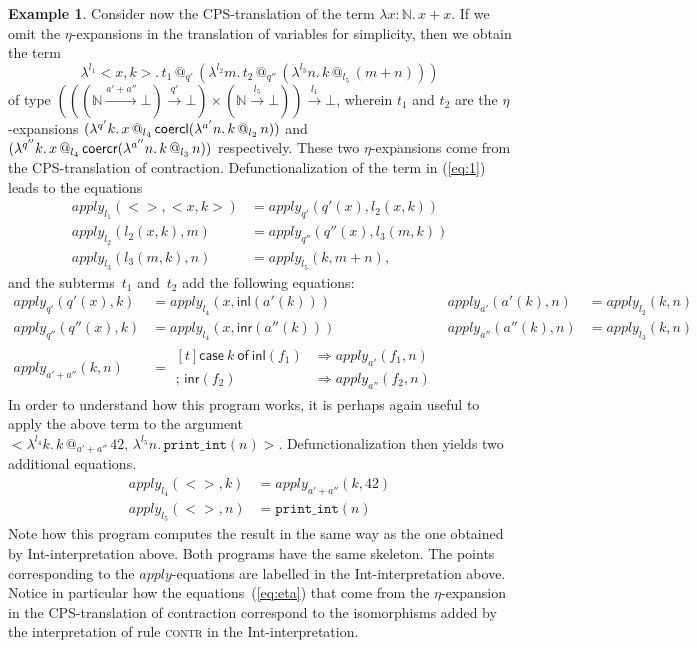 \documentclass{LMCS}
\makeatletter
\theoremstyle{definition}
\newtheorem{example}[thm]{Example}
\theoremstyle{plain}
\newcommand{\kw}[1]{\mathsf{#1}}
\newcommand{\NN}{\mathbb{N}}
\newcommand{\Capply}{\textit{apply}}
\newcommand{\R}[1]{\textsc{#1}}
\newcommand{\xto}{\xrightarrow}
\newcommand{\tlami}[3]{\lambda {#1}{:}{#2}.\, {#3}}
\newcommand{\tappl}[3]{{#1} {\,@_{#2}\,} {#3}}
\newcommand{\tmcase}[5]{\!\begin{aligned}[t]
  \kw{case}\ #1\ \kw{of}\ 
     \kw{inl}(#2) &\Rightarrow #3 \\[-.27em]
    ;\, \kw{inr}(#4) &\Rightarrow #5    
  \end{aligned}
  }
\makeatother
\begin{document}
\begin{example}
Consider now the CPS-translation of the term
$\tlami x \NN {x + x}$.
If we omit the $\eta$-expansions in the translation of 
variables for simplicity, then
we obtain the term
\begin{equation}
  \label{eq:1}
  \lambda^{l_1} <x,k>.\, \tappl {t_1} {q'} {(\lambda^{l_2} m.\, \tappl {t_2} {q''} {(\lambda^{l_3} n.\, \tappl k {l_5} {(m+n)})})}
\end{equation}
of type 
$ (((\NN \xto{a'+a''} \bot) \xto{q'} \bot) 
  \times (\NN \xto{l_5} \bot))
  \xto{l_1} \bot$,
wherein
$t_1$ and $t_2$ are
the $\eta$-expansions
$(\lambda^{q'} k.\, \tappl x {l_4} {\coercl{a'+a''}{\lambda^{a'} n.\, \tappl k {l_2} n)}}$
and
$(\lambda^{q''} k.\, \tappl x {l_4} {\coercr{a'+a''}{\lambda^{a''} n.\, \tappl k {l_3} n)}}$
respectively.
These two $\eta$-expansions come from the CPS-translation of contraction.
Defunctionalization of the term in (\ref{eq:1}) leads to the equations
\begin{align*}
  \Capply_{l_1}(<>, <x,k>) &= \Capply_{q'}(q'(x), {l_2}(x,k))
  \\
  \Capply_{l_2}(l_2(x,k), m) &= \Capply_{q''}(q''(x), l_3(m,k))
  \\
  \Capply_{l_3}(l_3(m,k),n) &= \Capply_{l_5}(k, m+n),
\end{align*}
and the subterms~$t_1$ and~$t_2$ add the following equations:
\begin{equation}
\begin{aligned}
  \label{eq:eta}
  \Capply_{q'}(q'(x), k) &= \Capply_{l_4}(x, \kw{inl}(a'(k)))
  &
  \Capply_{a'}(a'(k), n) &= \Capply_{l_2}(k, n)
  \\
  \Capply_{q''}(q''(x), k) &= \Capply_{l_4}(x, \kw{inr}(a''(k)))
  &
  \Capply_{a''}(a''(k), n) &= \Capply_{l_3}(k, n)
  \\
  \Capply_{a'+a''}(k, n)  
  &=
  \tmcase k {f_1} {\Capply_{a'}(f_1, n)} 
            {f_2} {\Capply_{a''}(f_2, n)} 
\end{aligned}
\end{equation}
In order to understand how this program works, it is perhaps again
useful to apply the above term to the argument
$<\lambda^{l_4} k.\, \tappl k {a' + a''} 42,\, \lambda^{l_5} n.\, \texttt{print\_int}(n)>$.
Defunctionalization then yields two additional equations.
\begin{align*}
  \Capply_{l_4}(<>, k) 
  &=  \Capply_{a' + a''}(k, 42)
  \\
  \Capply_{l_5}(<>, n) &= \texttt{print\_int}(n)
\end{align*}
Note how this program computes the result in the same way as 
the one obtained by Int-interpretation above.
Both programs have the same skeleton.
The points corresponding to the $\Capply$-equations are
labelled in the Int-interpretation above.
Notice in particular how the equations~(\ref{eq:eta}) that come from the 
$\eta$-expansion in the CPS-translation of contraction correspond
to the isomorphisms added by the interpretation of 
rule \R{contr} in the Int-interpretation.
\end{example}
\end{document}
